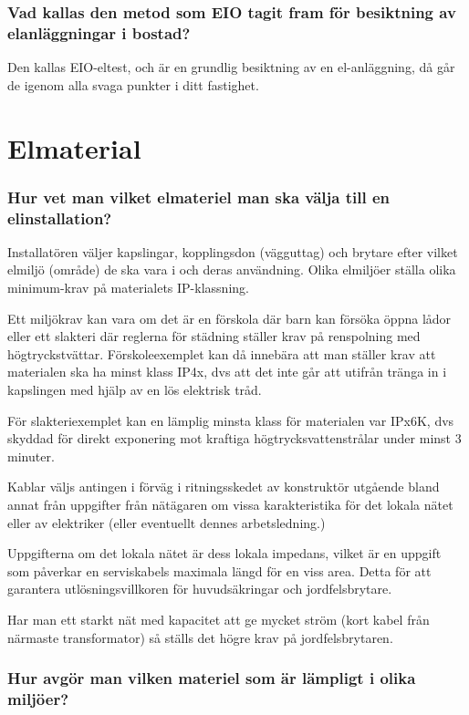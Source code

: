 \documentclass[a4paper,swedish]{article}
\begin{document}
\section{Vad kallas den metod som EIO tagit fram för besiktning av elanläggningar i bostad?}

Den kallas EIO-eltest, och är en grundlig besiktning av en el-anläggning, då går de igenom alla svaga punkter i ditt fastighet.

\part{Elmaterial}

\setcounter{section}{0}
\section{Hur vet man vilket elmateriel man ska välja till en elinstallation?}

Installatören väljer kapslingar, kopplingsdon (vägguttag) och brytare efter vilket elmiljö (område)
de ska vara i och deras användning. Olika elmiljöer ställa olika minimum-krav på materialets IP-klassning.

Ett miljökrav kan vara om det är en förskola där barn kan försöka öppna lådor eller ett slakteri där
reglerna för städning ställer krav på renspolning med högtryckstvättar. Förskoleexemplet kan då innebära att
man ställer krav att materialen ska ha minst klass IP4x, dvs att det inte går att utifrån tränga in i
kapslingen med hjälp av en lös elektrisk tråd.

För slakteriexemplet kan en lämplig minsta klass för materialen var IPx6K, dvs skyddad för direkt
exponering mot kraftiga högtrycksvattenstrålar under minst 3 minuter.

Kablar väljs antingen i förväg i ritningsskedet av konstruktör utgående bland annat från
uppgifter från nätägaren om vissa karakteristika för det lokala nätet eller av
elektriker (eller eventuellt dennes arbetsledning.)

Uppgifterna om det lokala nätet är dess lokala impedans, vilket är en uppgift som
påverkar en serviskabels maximala längd för en viss area.
Detta för att garantera utlösningsvillkoren för huvudsäkringar och jordfelsbrytare.

Har man ett starkt nät med kapacitet att ge mycket ström (kort kabel från närmaste transformator)
så ställs det högre krav på jordfelsbrytaren.

\section{Hur avgör man vilken materiel som är lämpligt i olika miljöer?}
\label{sec:q_m_2}
\end{document}
